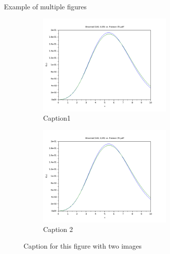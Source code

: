 \documentclass[11pt]{article} %
\begin{document}
Example of multiple figures
\begin{figure}[h]
 
\begin{subfigure}{0.5\textwidth}
\includegraphics[width=0.9\linewidth, height=5cm]{BinomialevsPoisson.png} 
\caption{Caption1}
\label{fig:subim1}
\end{subfigure}
\begin{subfigure}{0.5\textwidth}
\includegraphics[width=0.9\linewidth, height=5cm]{BinomialevsPoisson.png}
\caption{Caption 2}
\label{fig:subim2}
\end{subfigure}
 
\caption{Caption for this figure with two images}
\label{fig:image2}
\end{figure}
\end{document}
